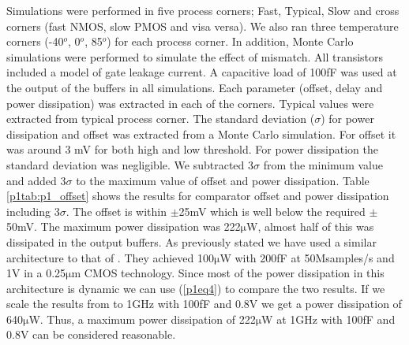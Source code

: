 Simulations were performed in five process corners; Fast, Typical,
Slow and cross corners (fast NMOS, slow PMOS and visa versa). We also
ran three temperature corners (-40$^{o}$, 0$^{o}$, 85$^{o}$) for each
process corner. In addition, Monte Carlo simulations were performed to
simulate the effect of mismatch. All transistors included a model of
gate leakage current. A capacitive load of 100fF was used at the output
of the buffers in all simulations. Each parameter (offset, delay and
power dissipation) was extracted in each of the corners. Typical values
were extracted from typical process corner. The standard deviation
(\begin{math}\sigma{}\end{math}) for power dissipation and offset was
extracted from a Monte Carlo simulation. For offset it was around 3 mV
for both high and low threshold. For power dissipation the standard
deviation was negligible. We subtracted 3\begin{math}\sigma{}\end{math}
from the minimum value and added 3\begin{math}\sigma{}\end{math} to the
maximum value of offset and power dissipation. Table \ref{p1tab:p1_offset} shows the
results for comparator offset and power dissipation including
3\begin{math}\sigma{}\end{math}.  The offset is within
\begin{math}\pm{}\end{math}25mV which is well below the required
\begin{math}\pm{}\end{math}50mV. The maximum power dissipation was
222\begin{math}\mathrm{\mu}\end{math}W, almost half of this was
dissipated in the output buffers. As previously stated we have used a
similar architecture to that of \cite{lofti03}. They achieved 100\begin{math}\mathrm{\mu}\end{math}W with 200fF at
50Msamples/s and 1V in a 0.25\begin{math}\mathrm{\mu}\end{math}m CMOS
technology. Since most of the power dissipation in this architecture is
dynamic we can use (\ref{p1eq4})
to compare the two results.  If we scale the results from \cite{lofti03}
to 1GHz with 100fF and 0.8V we get a power dissipation of
640\begin{math}\mathrm{\mu}\end{math}W. Thus, a maximum power
dissipation of 222\begin{math}\mathrm{\mu}\end{math}W at 1GHz with
100fF and 0.8V can be considered reasonable.
 


